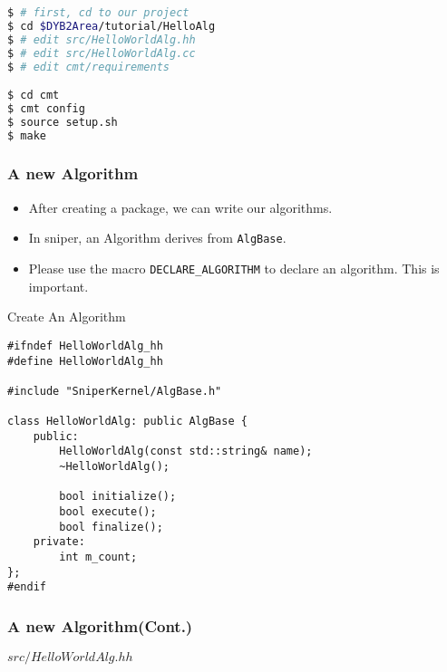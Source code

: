 \newsavebox{\createalg}
\begin{lrbox}{\createalg}
\begin{lstlisting}[language=bash]
$ # first, cd to our project
$ cd $DYB2Area/tutorial/HelloAlg
$ # edit src/HelloWorldAlg.hh
$ # edit src/HelloWorldAlg.cc
$ # edit cmt/requirements

$ cd cmt
$ cmt config
$ source setup.sh
$ make
\end{lstlisting}
\end{lrbox}

\begin{frame}
    \frametitle{A new Algorithm}
    \begin{itemize}
        \item After creating a package, we can write our algorithms.
        \item In sniper, an Algorithm derives from {\tt AlgBase}.
        \item Please use the macro {\tt DECLARE\_ALGORITHM} to declare
              an algorithm. This is important.
    \end{itemize}
    \begin{block}{Create An Algorithm}
        \par\usebox{\createalg}
    \end{block}
\end{frame}

\newsavebox{\createalgheader}
\begin{lrbox}{\createalgheader}
\begin{lstlisting}
#ifndef HelloWorldAlg_hh
#define HelloWorldAlg_hh

#include "SniperKernel/AlgBase.h"

class HelloWorldAlg: public AlgBase {
    public:
        HelloWorldAlg(const std::string& name);
        ~HelloWorldAlg();

        bool initialize();
        bool execute();
        bool finalize();
    private:
        int m_count;
};
#endif
\end{lstlisting}
\end{lrbox}

\begin{frame}
    \frametitle{A new Algorithm(Cont.)}
    \begin{block}{\(src/HelloWorldAlg.hh\)}
        \par\usebox{\createalgheader}
    \end{block}
\end{frame}

